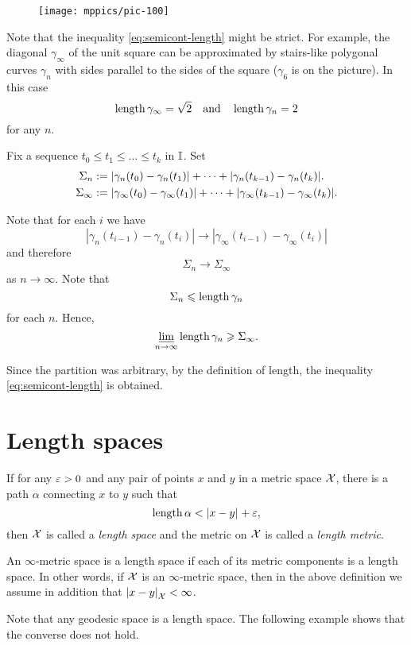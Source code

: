 \begin{wrapfigure}{o}{20 mm}
\vskip-0mm
\centering
\texttt{[image: mppics/pic-100]}
\end{wrapfigure}

Note that the inequality \ref{eq:semicont-length} might be strict.
For example, the diagonal $\gamma_\infty$ of the unit square 
can be  approximated by stairs-like
polygonal curves $\gamma_n$
with sides parallel to the sides of the square ($\gamma_6$ is on the picture).
In this case
\[\mathop{\rm length}\nolimits\gamma_\infty=\sqrt{2}\quad
\text{and}\quad \mathop{\rm length}\nolimits\gamma_n=2\]
for any $n$.

Fix a sequence $t_0\le t_1\le\dots\le t_k$ in $\mathbb{I}$.
Set 
\begin{align*}\Sigma_n
&\mathrel{:=}
|\gamma_n(t_0)-\gamma_n(t_1)|+\dots+|\gamma_n(t_{k-1})-\gamma_n(t_k)|.
\\
\Sigma_\infty
&\mathrel{:=}
|\gamma_\infty(t_0)-\gamma_\infty(t_1)|+\dots+|\gamma_\infty(t_{k-1})-\gamma_\infty(t_k)|.
\end{align*}

Note that for each $i$ we have 
\[|\gamma_n(t_{i-1})-\gamma_n(t_i)|\to|\gamma_\infty(t_{i-1})-\gamma_\infty(t_i)|\]
and therefore
\[\Sigma_n\to \Sigma_\infty\] 
as $n\to\infty$.
Note that 
\[\Sigma_n\leqslant\mathop{\rm length}\nolimits\gamma_n\]
for each $n$.
Hence,
$$\varliminf_{n\to\infty} \mathop{\rm length}\nolimits\gamma_n \geqslant \Sigma_\infty.$$

Since the partition was arbitrary, by the definition of length, the inequality  \ref{eq:semicont-length} is obtained.
\qeds

\section{Length spaces}\label{sec:intrinsic}

If for any $\varepsilon>0$ and any pair of points $x$ and $y$ in a metric space $\mathcal{X}$, there is a path $\alpha$ connecting $x$ to $y$ such that
\[\length\alpha< \dist{x}{y}{}+\eps,\]
then $\mathcal{X}$ is called a \emph{length space} and the metric on $\mathcal{X}$ is called a \emph{length metric}.\label{page:length metric}

An $\infty$-metric space is a length space if each of its metric components is a length space.
In other words, if $\mathcal{X}$ is an $\infty$-metric space, then in the above definition we assume in addition that $\dist{x}{y}{\spc{X}}<\infty$.

Note that any geodesic space is a length space.
The following example shows that the converse does not hold.


